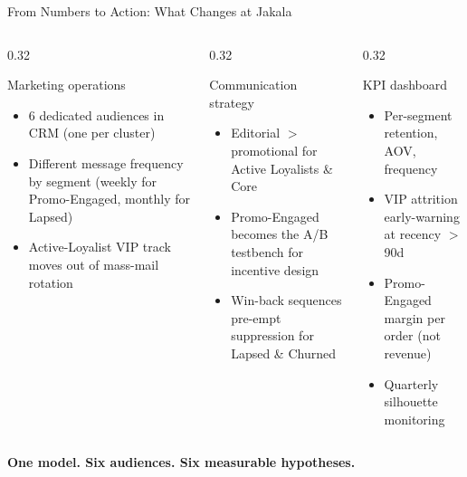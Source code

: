 \documentclass[aspectratio=169,10pt]{beamer}
\begin{document}
\begin{frame}{From Numbers to Action: What Changes at Jakala}
\begin{columns}[T]
  \begin{column}{0.32\textwidth}
    \begin{block}{Marketing operations}
    \small
    \begin{itemize}
      \item 6 dedicated audiences in CRM (one per cluster)
      \item Different message frequency by segment (weekly for Promo-Engaged, monthly for Lapsed)
      \item Active-Loyalist VIP track moves out of mass-mail rotation
    \end{itemize}
    \end{block}
  \end{column}
  \begin{column}{0.32\textwidth}
    \begin{block}{Communication strategy}
    \small
    \begin{itemize}
      \item Editorial $>$ promotional for Active Loyalists \& Core
      \item Promo-Engaged becomes the A/B testbench for incentive design
      \item Win-back sequences pre-empt suppression for Lapsed \& Churned
    \end{itemize}
    \end{block}
  \end{column}
  \begin{column}{0.32\textwidth}
    \begin{block}{KPI dashboard}
    \small
    \begin{itemize}
      \item Per-segment retention, AOV, frequency
      \item VIP attrition early-warning at recency $>$90d
      \item Promo-Engaged margin per order (not revenue)
      \item Quarterly silhouette monitoring
    \end{itemize}
    \end{block}
  \end{column}
\end{columns}
\vspace{0.4em}
\centering
\textbf{\color{accent}One model. Six audiences. Six measurable hypotheses.}
\end{frame}
\end{document}
